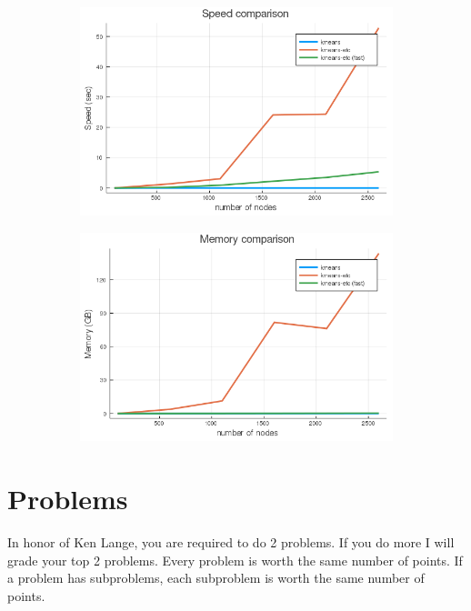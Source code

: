 \documentclass[./some_latex_template.tex]{subfiles}
\begin{document}
\begin{figure}[H]
  \begin{subfigure}[b]{0.45\textwidth}
    \includegraphics[width=\textwidth]{figures/speed.png}
  \end{subfigure}
  \begin{subfigure}[b]{0.45\textwidth}
    \includegraphics[width=\textwidth]{figures/memory.png}
  \end{subfigure}
\end{figure}

\section{Problems}

In honor of Ken Lange, you are required to do 2 problems. If you do more I will grade your top 2 problems. Every problem is worth the same number of points. If a problem has subproblems, each subproblem is worth the same number of points.
\end{document}

